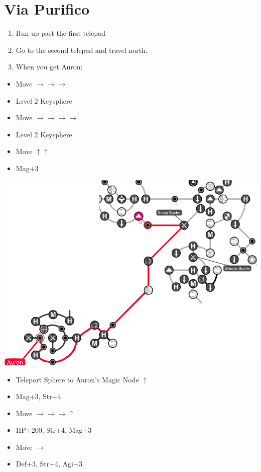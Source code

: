 \chapter{Via Purifico}

\begin{enumerate}
  \item Run up past the first telepad
  \item Go to the second telepad and travel north.
  \item When you get Auron:
\end{enumerate}
\begin{spheregrid}
  \begin{itemize}
    \auronf
    \begin{itemize}
      \item Move $\rightarrow\rightarrow\rightarrow$
      \item Level 2 Keysphere
      \item Move $\rightarrow\rightarrow\rightarrow\rightarrow$
      \item Level 2 Keysphere
      \item Move $\uparrow\uparrow$
      \item Mag+3
    \end{itemize}
    \includegraphics[width=.8\columnwidth]{graphics/Auron_Via_Purifico}
    \yunaf
    \begin{itemize}
      \item Teleport Sphere to Auron's Magic Node $\uparrow$
      \item Mag+3, Str+4
      \item Move $\rightarrow\rightarrow\rightarrow\uparrow$
      \item HP+200, Str+4, Mag+3
      \item Move $\rightarrow$
      \item Def+3, Str+4, Agi+3

\end{itemize}
\end{itemize}
\end{spheregrid}
